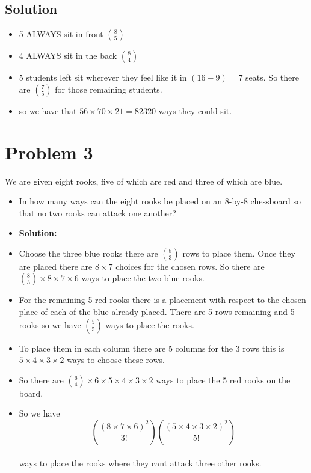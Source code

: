 \documentclass{article}
\begin{document}
\subsection*{Solution}
    \begin{itemize}
        \item 5 ALWAYS sit in front $\binom{8}{5}$
        \item 4 ALWAYS sit in the back $\binom{8}{4}$
        \item 5 students left sit wherever they feel like it in $(16-9) = 7$ seats. So there are $\binom{7}{5}$ for those remaining students. 
        \item so we have that $56 \times 70 \times 21 = 82320$ ways they could sit.
    \end{itemize}
    
\section*{Problem 3}
 We are given eight rooks, five of which are red and three of which are blue.
 \begin{itemize}
     \item In how many ways can the eight rooks be placed on an 8-by-8 chessboard so that no two rooks can attack one another?
     \item \textbf{Solution: }
     \item Choose the three blue rooks there are $\binom{8}{3}$ rows to place them. Once they are placed there are $8 \times 7$ choices for the chosen rows. So there are $\binom{8}{3} \times 8 \times 7 \times 6$ ways to place the two blue rooks. 
     \item For the remaining 5 red rooks there is a placement with respect to the chosen place of each of the blue already placed. There are 5 rows remaining and 5 rooks so we have $\binom{5}{5}$ ways to place the rooks. 
     \item To place them in each column there are 5 columns for the 3 rows this is $5 \times 4 \times 3 \times 2$ ways to choose these rows.
     \item So there are $\binom{6}{4} \times 6 \times 5 \times 4 \times 3 \times 2$ ways to place the 5 red rooks on the board.
     \item So we have $$(\frac{(8 \times 7 \times 6)^{2}}{3!})(\frac{(5 \times 4 \times 3 \times 2)^{2}}{5!})$$ \\ 
 ways to place the rooks where they cant attack three other rooks.
 \end{itemize}
 
\end{document}
